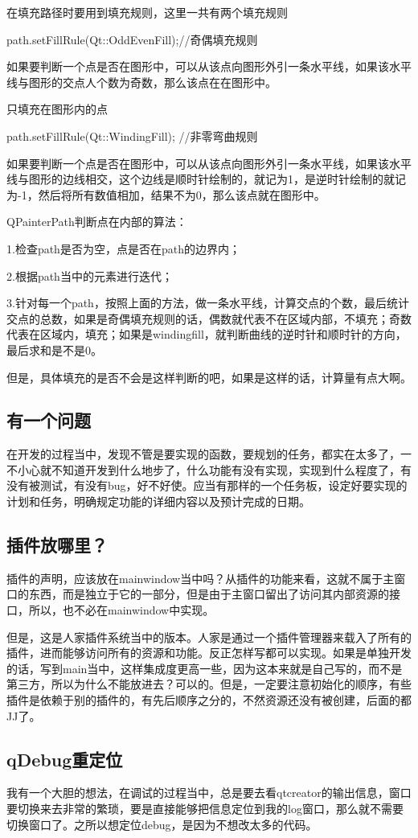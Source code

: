 在填充路径时要用到填充规则，这里一共有两个填充规则

path.setFillRule(Qt::OddEvenFill);//奇偶填充规则

如果要判断一个点是否在图形中，可以从该点向图形外引一条水平线，如果该水平线与图形的交点人个数为奇数，那么该点在在图形中。

只填充在图形内的点

path.setFillRule(Qt::WindingFill); //非零弯曲规则

如果要判断一个点是否在图形中，可以从该点向图形外引一条水平线，如果该水平线与图形的边线相交，这个边线是顺时针绘制的，就记为1，是逆时针绘制的就记为-1，然后将所有数值相加，结果不为0，那么该点就在图形中。

QPainterPath判断点在内部的算法：

1.检查path是否为空，点是否在path的边界内；

2.根据path当中的元素进行迭代；

3.针对每一个path，按照上面的方法，做一条水平线，计算交点的个数，最后统计交点的总数，如果是奇偶填充规则的话，偶数就代表不在区域内部，不填充；奇数代表在区域内，填充；如果是windingfill，就判断曲线的逆时针和顺时针的方向，最后求和是不是0。

但是，具体填充的是否不会是这样判断的吧，如果是这样的话，计算量有点大啊。
\subsection{有一个问题}
在开发的过程当中，发现不管是要实现的函数，要规划的任务，都实在太多了，一不小心就不知道开发到什么地步了，什么功能有没有实现，实现到什么程度了，有没有被测试，有没有bug，好不好使。应当有那样的一个任务板，设定好要实现的计划和任务，明确规定功能的详细内容以及预计完成的日期。
\subsection{插件放哪里？}
插件的声明，应该放在mainwindow当中吗？从插件的功能来看，这就不属于主窗口的东西，而是独立于它的一部分，但是由于主窗口留出了访问其内部资源的接口，所以，也不必在mainwindow中实现。

但是，这是人家插件系统当中的版本。人家是通过一个插件管理器来载入了所有的插件，进而能够访问所有的资源和功能。反正怎样写都可以实现。如果是单独开发的话，写到main当中，这样集成度更高一些，因为这本来就是自己写的，而不是第三方，所以为什么不能放进去？可以的。但是，一定要注意初始化的顺序，有些插件是依赖于别的插件的，有先后顺序之分的，不然资源还没有被创建，后面的都JJ了。
\subsection{qDebug重定位}
我有一个大胆的想法，在调试的过程当中，总是要去看qtcreator的输出信息，窗口要切换来去非常的繁琐，要是直接能够把信息定位到我的log窗口，那么就不需要切换窗口了。之所以想定位debug，是因为不想改太多的代码。

